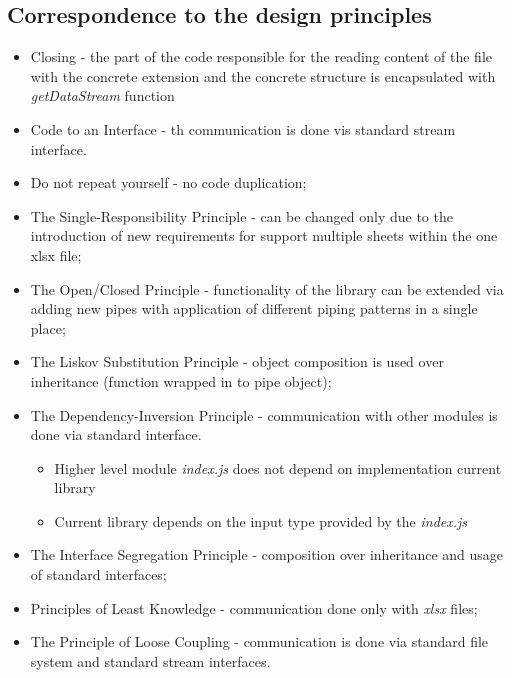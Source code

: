 \subsection{Correspondence to the design principles}
\begin{itemize}
	\item Closing - the part of the code responsible for the reading content of the file with the concrete extension and the concrete structure is encapsulated with \textit{getDataStream} function
	\item Code to an Interface - th communication is done vis standard stream interface.
	\item Do not repeat yourself - no code duplication;
	\item The Single-Responsibility Principle - can be changed only due to the introduction of new requirements for support multiple sheets within the one xlsx file;
	\item The Open/Closed Principle - functionality of the library can be extended via adding new pipes with application of different piping patterns in a single place;
	\item The Liskov Substitution Principle - object composition is used over inheritance (function wrapped in to pipe object);
	\item The Dependency-Inversion Principle - communication with other modules is done via standard interface.
		\begin{itemize}
			\item Higher level module \textit{index.js} does not depend on implementation current library
			\item Current library depends on the input type provided by the \textit{index.js}
		\end{itemize}
	\item The Interface Segregation Principle - composition over inheritance and usage of standard interfaces;
	\item Principles of Least Knowledge - communication done only with \textit{xlsx} files;
	\item The Principle of Loose Coupling - communication is done via standard file system and standard stream interfaces.
\end{itemize}

